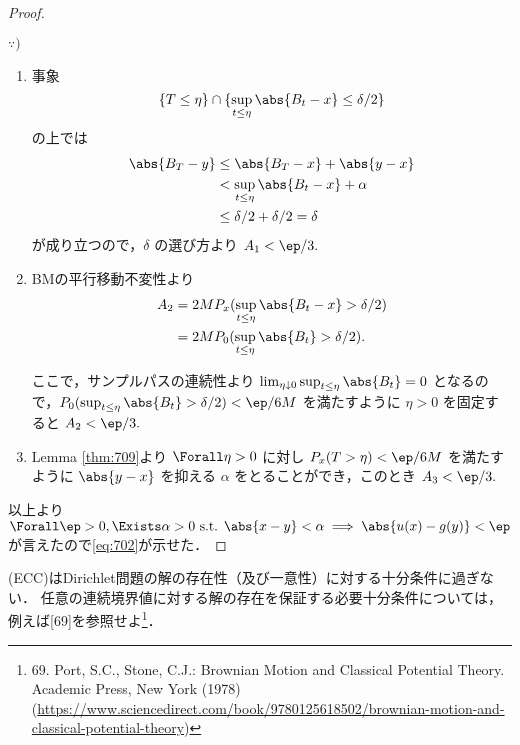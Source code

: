 \documentclass{jsarticle}
\begin{document}
\begin{proof}
    \begin{screen}
        $\because)$
        \begin{enumerate}[label=(\roman*)]
            \item 
            事象
            $$
            \{T\le\eta\}\cap\{\sup_{t\le\eta}\abs{B_t-x}\le\delta/2\}
            $$
            の上では
            \begin{align}
                \abs{B_T-y}
                &\le \abs{B_T-x}+\abs{y-x} \\
                &< \sup_{t\le\eta}\abs{B_t-x}+\alpha \\
                &\le \delta/2+\delta/2
                =\delta
            \end{align}
            が成り立つので，$\delta$ の選び方より $A_1<\ep/3.$
            \item
            BMの平行移動不変性より
            \begin{align}
                A_2
                &= 2MP_x(\sup_{t\le\eta}\abs{B_t-x}>\delta/2) \\
                &= 2MP_0(\sup_{t\le\eta}\abs{B_t}>\delta/2).
            \end{align}

            ここで，サンプルパスの連続性より $\lim_{\eta\downarrow0}\sup_{t\le\eta}\abs{B_t}=0$ となるので，$P_0(\sup_{t\le\eta}\abs{B_t}>\delta/2)<\ep/6M$ を満たすように $\eta>0$ を固定すると $A_2<\ep/3.$
            \item
            Lemma \ref{thm:709}より $\Forall \eta>0$ に対し $P_x(T>\eta)<\ep/6M$ を満たすように $\abs{y-x}$ を抑える $\alpha$ をとることができ，このとき $A_3<\ep/3.$
        \end{enumerate}
    \end{screen}

    以上より $\Forall \ep>0, \Exists \alpha>0\text{ s.t. }\abs{x-y}<\alpha\implies \abs{u(x)-g(y)}<\ep$ が言えたので\eqref{eq:702}が示せた．
\end{proof}


\begin{remark*}
    (ECC)はDirichlet問題の解の存在性（及び一意性）に対する十分条件に過ぎない．
    任意の連続境界値に対する解の存在を保証する必要十分条件については，例えば[69]を参照せよ\footnote{69. Port, S.C., Stone, C.J.: Brownian Motion and Classical Potential Theory. Academic Press, New York (1978) (\url{https://www.sciencedirect.com/book/9780125618502/brownian-motion-and-classical-potential-theory})}．
\end{remark*}
\end{document}
